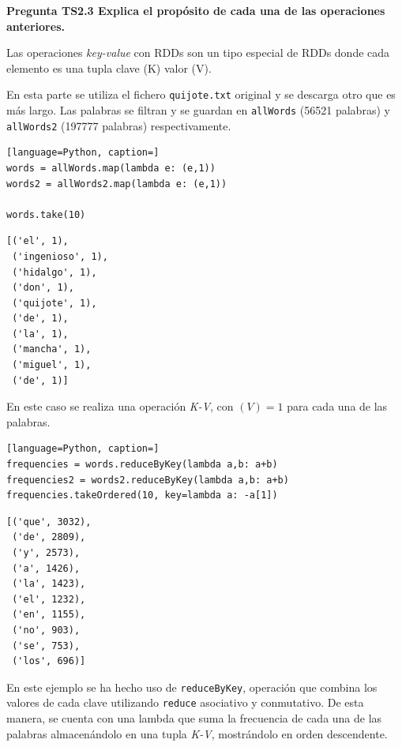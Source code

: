\documentclass[10pt,swedish, openany]{book}
\begin{document}
\vspace{0.8em}

\textbf{Pregunta TS2.3 Explica el propósito de cada una de las operaciones anteriores.}

Las operaciones \textit{key-value} con RDDs son un tipo especial de RDDs donde cada elemento es una tupla clave (K) valor (V). 

En esta parte se utiliza el fichero \texttt{quijote.txt} original y se descarga otro que es más largo. Las palabras se filtran y se guardan en \texttt{allWords} (56521 palabras) y \texttt{allWords2} (197777 palabras) respectivamente.

\begin{lstlisting}[language=Python, caption=]
words = allWords.map(lambda e: (e,1))
words2 = allWords2.map(lambda e: (e,1))

words.take(10)
\end{lstlisting}
\begin{verbatim}
[('el', 1),
 ('ingenioso', 1),
 ('hidalgo', 1),
 ('don', 1),
 ('quijote', 1),
 ('de', 1),
 ('la', 1),
 ('mancha', 1),
 ('miguel', 1),
 ('de', 1)]
\end{verbatim}

En este caso se realiza una operación \textit{K-V}, con $(V)=1$ para cada una de las palabras.

\begin{lstlisting}[language=Python, caption=]
frequencies = words.reduceByKey(lambda a,b: a+b)
frequencies2 = words2.reduceByKey(lambda a,b: a+b)
frequencies.takeOrdered(10, key=lambda a: -a[1])
\end{lstlisting}
\begin{verbatim}
[('que', 3032),
 ('de', 2809),
 ('y', 2573),
 ('a', 1426),
 ('la', 1423),
 ('el', 1232),
 ('en', 1155),
 ('no', 903),
 ('se', 753),
 ('los', 696)]
\end{verbatim}

En este ejemplo se ha hecho uso de \texttt{reduceByKey}, operación que combina los valores de cada clave utilizando \texttt{reduce} asociativo y conmutativo. De esta manera, se cuenta con una lambda que suma la frecuencia de cada una de las palabras almacenándolo en una tupla \textit{K-V}, mostrándolo en orden descendente. 


\end{document}
